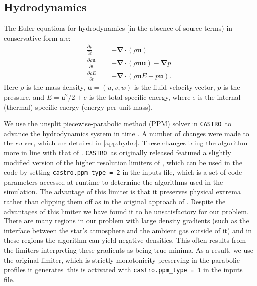 \documentclass[iop]{../emulateapj}
\newcommand{\castro}{\texttt{CASTRO}}
\begin{document}
\subsection{Hydrodynamics}\label{sec:Hydrodynamics}

The Euler equations for hydrodynamics (in the absence of source terms) in conservative form are: 
\begin{align}
  \frac{\partial \rho}{\partial t} &= -\bm{\nabla} \cdot (\rho \mathbf{u}) \label{eq:euler_density}\\
  \frac{\partial \rho \mathbf{u}}{\partial t} &= -\bm{\nabla} \cdot (\rho \mathbf{u}\mathbf{u}) - \bm{\nabla}p \label{eq:euler_momentum}\\
  \frac{\partial \rho E}{\partial t} &= -\bm{\nabla}\cdot(\rho\mathbf{u}E + p\mathbf{u}). \label{eq:euler_energy}
\end{align}
Here $\rho$ is the mass density, $\mathbf{u} = (u, v, w)$ is the fluid velocity
vector, $p$ is the pressure, and $E = \mathbf{u}^2 / 2 + e$ is the
total specific energy, where $e$ is the internal (thermal) specific
energy (energy per unit mass).

We use the unsplit piecewise-parabolic method (PPM) solver in \castro\
to advance the hydrodynamics system in time \citep{ppmunsplit}.  A
number of changes were made to the solver, which are detailed in \autoref{app:hydro}.
These changes bring the algorithm more in line with that of
\cite{ppm}. \castro\ as originally released featured a slightly modified
version of the higher resolution limiters of
\cite{colella_sekora:2008}, which can be used in the code by setting 
\texttt{castro.ppm\_type = 2} in the inputs file, which is a set of code parameters
accessed at runtime to determine the algorithms used in the simulation.
The advantage of this limiter is that
it preserves physical extrema rather than clipping them off as in the
original approach of \cite{ppm}. Despite the advantages of this limiter 
we have found it to be unsatisfactory for our problem. There are many regions in our
problem with large density gradients (such as the interface between
the star's atmosphere and the ambient gas outside of it) and in these
regions the algorithm can yield negative densities. This often results
from the limiters interpreting these gradients as being true
minima. As a result, we use the original limiter, which is strictly
monotonicity preserving in the parabolic profiles it generates; this
is activated with \texttt{castro.ppm\_type = 1} in the inputs file.
\end{document}
